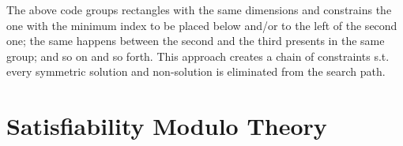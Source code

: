 \documentclass[a4paper,10pt]{article}
\begin{document}
The above code groups rectangles with the same dimensions and constrains the one with the minimum index to be placed below and/or to the left of the second one; the same happens between the second and the third presents in the same group; and so on and so forth. This approach creates a chain of constraints s.t. every symmetric solution and non-solution is eliminated from the search path.

\section{Satisfiability Modulo Theory}

\printbibliography
\end{document}
